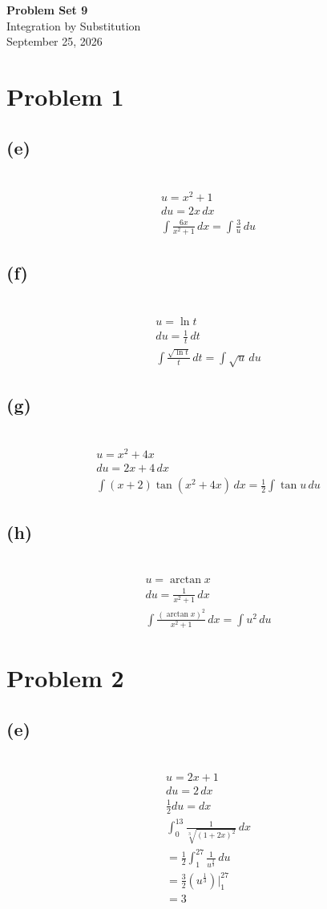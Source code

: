 \documentclass[12pt]{article}
\newcommand*{\cbrt}[1]{\ensuremath{\sqrt[3]{#1}}}
\newcommand{\problem}[1]{\section{Problem #1}}
\newcommand{\subproblem}[1]{\subsection{(#1)} \,}
\begin{document}
\vspace*{0cm}

\begin{center}
    {\Large \bfseries Problem Set 9} \\[0.5cm]
    {\large Integration by Substitution} \\[0.35cm]
    {\normalsize September 25, 2026}
\end{center}


\problem{1}

\subproblem{e}
\begin{gather*}
    u=x^2+1\\
    du=2x\, dx\\
    \int \frac{6x}{x^2+1}\, dx=\boxed{\int \frac{3}{u}\, du}
\end{gather*}

\subproblem{f}
\begin{gather*}
    u=\ln t\\
    du=\frac{1}{t} \, dt\\
    \int \frac{\sqrt{\ln t}}{t}\, dt=\boxed{\int \sqrt{u}\, du}
\end{gather*}

\subproblem{g}
\begin{gather*}
    u=x^2+4x\\
    du=2x+4\, dx\\
    \int (x+2)\tan (x^2+4x)\, dx=\boxed{\frac{1}{2}\int \tan u\, du}
\end{gather*}

\subproblem{h}
\begin{gather*}
    u=\arctan x\\
    du=\frac{1}{x^2+1}\, dx\\
    \int \frac{(\arctan x)^2}{x^2+1}\, dx=\boxed{\int u^2\, du}
\end{gather*}

\problem{2}

\subproblem{e}
\begin{gather*}
    u=2x+1\\
    du=2\, dx\\
    \frac{1}{2}du=dx\\
    \int_0^{13} \frac{1}{\cbrt{(1+2x)^2}}\, dx\\
    =\frac{1}{2}\int_1^{27} \frac{1}{u^\frac{2}{3}}\, du\\
    =\frac{3}{2}(u^\frac{1}{3})\Big|^{27}_1\\
    =\boxed{3}
\end{gather*}
\end{document}
